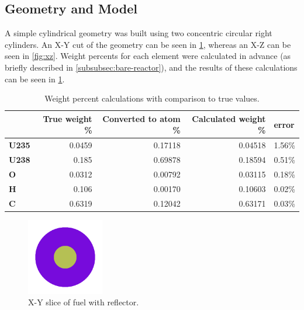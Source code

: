 \documentclass{anstrans}
\begin{document}
    \subsection{Geometry and Model}
    A simple cylindrical geometry was built using two concentric circular right cylinders.
    An X-Y cut of the geometry can be seen in \cref{fig:xy}, whereas an X-Z can be seen in \cref{fig:xz}.
    Weight percents for each element were calculated in advance (as briefly described in \cref{subsubsec:bare-reactor}), and the results of these calculations can be seen in \cref{tab: weight percent calcs}.
    \begin{table}
        \centering
        \begin{tabular}{lrrrl}
            \toprule
            \textbf{}     & \textbf{True weight \%} & \textbf{Converted to atom \%} & \textbf{Calculated weight \%} & \textbf{error} \\
            \midrule
            \textbf{U235} & 0.0459                  & 0.17118                       & 0.04518                       & 1.56\%         \\
            \textbf{U238} & 0.185                   & 0.69878                       & 0.18594                       & 0.51\%         \\
            \textbf{O}    & 0.0312                  & 0.00792                       & 0.03115                       & 0.18\%         \\
            \textbf{H}    & 0.106                   & 0.00170                       & 0.10603                       & 0.02\%         \\
            \textbf{C }   & 0.6319                  & 0.12042                       & 0.63171                       & 0.03\%         \\
            \bottomrule
        \end{tabular}
        \caption{Weight percent calculations with comparison to true values.}
        \label{tab: weight percent calcs}
    \end{table}


    \begin{figure}[!htb]
        \centering
        \includegraphics[width=0.3\textwidth]{plot_1}
        \caption{X-Y slice of fuel with reflector.}
        \label{fig:xy}
    \end{figure}
\end{document}
